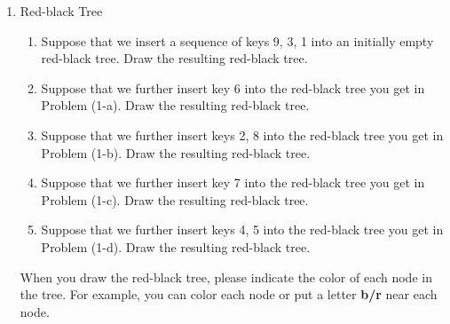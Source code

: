 \documentclass[12pt,a4paper]{article}
\theoremstyle{definition}
\begin{document}
\begin{enumerate}

\item	Red-black Tree
	\begin{enumerate}
		\item Suppose that we insert a sequence of keys 9, 3, 1 into an initially empty red-black tree. Draw the resulting red-black tree.
		
		\item Suppose that we further insert key 6 into the red-black tree you get in Problem (1-a). Draw the resulting red-black tree.
		
		\item Suppose that we further insert keys 2, 8 into the red-black tree you get in Problem (1-b). Draw the resulting red-black tree.
		
		\item Suppose that we further insert key 7 into the red-black tree you get in Problem (1-c). Draw the resulting red-black tree.
		
		\item Suppose that we further insert keys 4, 5 into the red-black tree you get in Problem (1-d). Draw the resulting red-black tree.
		
	\end{enumerate}
	
	When you draw the red-black tree, please indicate the color of each node in the tree.
For example, you can color each node or put a letter \textbf{b/r} near each node.


\end{enumerate}
\end{document}
